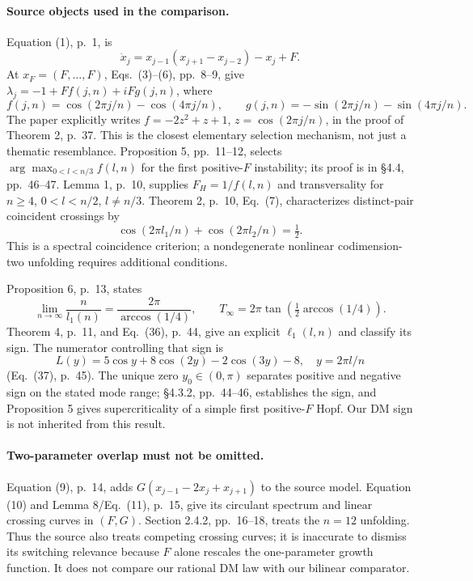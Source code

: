 \paragraph{Source objects used in the comparison.}
Equation (1), p.~1, is
\[
 \dot x_j=x_{j-1}(x_{j+1}-x_{j-2})-x_j+F.
\]
At $x_F=(F,\ldots,F)$, Eqs.~(3)--(6), pp.~8--9, give
$\lambda_j=-1+Ff(j,n)+iFg(j,n)$, where
\[
 f(j,n)=\cos(2\pi j/n)-\cos(4\pi j/n),\qquad
 g(j,n)=-\sin(2\pi j/n)-\sin(4\pi j/n).
\]
The paper explicitly writes $f=-2z^2+z+1$, $z=\cos(2\pi j/n)$,
in the proof of Theorem 2, p.~37. This is the closest elementary selection
mechanism, not just a thematic resemblance. Proposition 5, pp.~11--12,
selects $\arg\max_{0<l<n/3}f(l,n)$ for the first positive-$F$ instability;
its proof is in \S4.4, pp.~46--47. Lemma 1, p.~10, supplies
$F_H=1/f(l,n)$ and transversality for $n\ge4$, $0<l<n/2$, $l\ne n/3$.
Theorem 2, p.~10, Eq.~(7), characterizes distinct-pair coincident crossings by
\[
 \cos(2\pi l_1/n)+\cos(2\pi l_2/n)=\tfrac12.
\]
This is a spectral coincidence criterion; a nondegenerate nonlinear
codimension-two unfolding requires additional conditions.

Proposition 6, p.~13, states
\[
 \lim_{n\to\infty}\frac{n}{l_1(n)}=
 \frac{2\pi}{\arccos(1/4)},\qquad
 T_\infty=2\pi\tan\!\left(\tfrac12\arccos(1/4)\right).
\]
Theorem 4, p.~11, and Eq.~(36), p.~44, give an explicit $\ell_1(l,n)$
and classify its sign. The numerator controlling that sign is
\[
 L(y)=5\cos y+8\cos(2y)-2\cos(3y)-8,
 \quad y=2\pi l/n
\]
(Eq.~(37), p.~45). The unique zero $y_0\in(0,\pi)$ separates positive
and negative sign on the stated mode range; \S4.3.2, pp.~44--46,
establishes the sign, and Proposition 5 gives supercriticality of a simple
first positive-$F$ Hopf. Our DM sign is not inherited from this result.

\paragraph{Two-parameter overlap must not be omitted.}
Equation (9), p.~14, adds $G(x_{j-1}-2x_j+x_{j+1})$ to the source model.
Equation (10) and Lemma 8/Eq.~(11), p.~15, give its circulant spectrum
and linear crossing curves in $(F,G)$. Section 2.4.2, pp.~16--18, treats
the $n=12$ unfolding. Thus the source also treats competing crossing curves;
it is inaccurate to dismiss its switching relevance because $F$ alone
rescales the one-parameter growth function. It does not compare our
rational DM law with our bilinear comparator.

